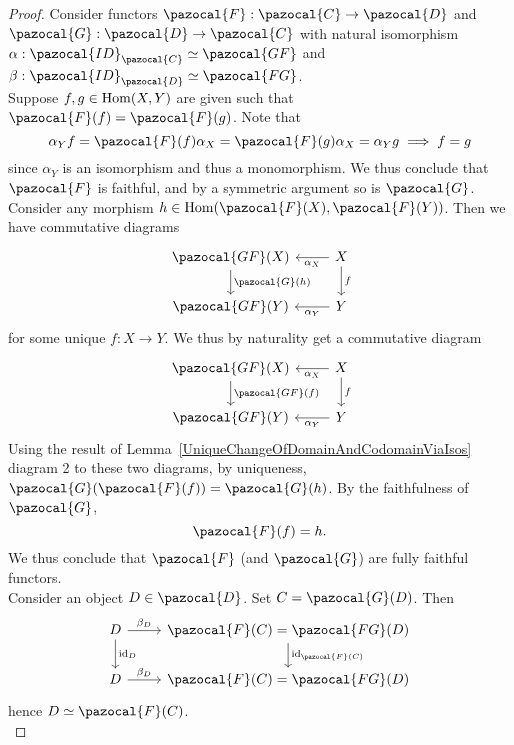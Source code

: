     \begin{proof}
        Consider functors $\pazocal{F}:\pazocal{C}\rightarrow \pazocal{D}$ and $\pazocal{G}:\pazocal{D}\rightarrow \pazocal{C}$ with natural isomorphism $\alpha: \pazocal{ID}_\pazocal{C}\simeq \pazocal{GF}$ and $\beta : \pazocal{ID}_\pazocal{D}\simeq \pazocal{FG}$.\\
         Suppose $f,g\in\mathrm{Hom}(X,Y)$ are given such that $\pazocal{F}(f)=\pazocal{F}(g)$. Note that
        $$
            \alpha_Y f =  \pazocal{F}(f)\alpha_X = \pazocal{F}(g)\alpha_X = \alpha_Y g \implies f=g 
        $$
        since $\alpha_Y$ is an isomorphism and thus a monomorphism. We thus conclude that $\pazocal{F}$ is faithful, and by a symmetric argument so is $\pazocal{G}$.\\
        Consider any morphism $h\in \Hom(\pazocal{F}(X),\pazocal{F}(Y))$. Then we have commutative diagrams 
        $$
            \begin{tikzcd}
                \pazocal{GF}(X) \arrow[d,"\pazocal{G}(h)"] & X \arrow[l,"\alpha_X"]\arrow[d,"f"]\\ 
                \pazocal{GF}(Y) & Y \arrow[l,"\alpha_Y"]   
            \end{tikzcd}
        $$  
        for some unique $f : X\rightarrow Y$. We thus by naturality get a commutative diagram
        $$
            \begin{tikzcd}
                \pazocal{GF}(X) \arrow[d,"\pazocal{GF}(f)"] & X \arrow[l,"\alpha_X"]\arrow[d,"f"]\\ 
                \pazocal{GF}(Y) & Y \arrow[l,"\alpha_Y"]   
            \end{tikzcd}
        $$
        Using the result of Lemma~\ref{UniqueChangeOfDomainAndCodomainViaIsos} diagram 2 to these two diagrams, by uniqueness, $\pazocal{G}(\pazocal{F}(f))=\pazocal{G}(h)$. By the faithfulness of $\pazocal{G}$, 
        $$
            \pazocal{F}(f) = h.
        $$  
        We thus conclude that $\pazocal{F}$ (and $\pazocal{G}$) are fully faithful functors.\\ 
        Consider an object $D\in \pazocal{D}$. Set $C= \pazocal{G}(D)$. Then 
        $$
            \begin{tikzcd}
                D \arrow[r,"\beta_D"]\arrow[d,"\id_D"] & \pazocal{F}(C) = \pazocal{FG}(D) \arrow[d,"\id_{\pazocal{F}(C)}"]\\
                D \arrow[r,"\beta_D"] & \pazocal{F}(C) = \pazocal{FG}(D)
            \end{tikzcd}
        $$
        hence $D\simeq \pazocal{F}(C)$.\\ 

\end{proof}
